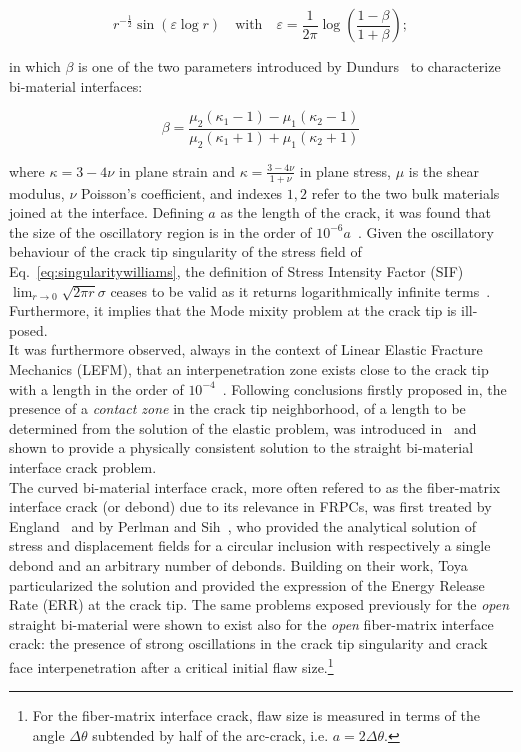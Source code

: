 \documentclass[review]{elsarticle}
\begin{document}
\begin{equation}\label{eq:singularitywilliams}
r^{-\frac{1}{2}}\sin\left(\varepsilon\log r\right)\quad\text{with}\quad\varepsilon=\frac{1}{2\pi}\log\left(\frac{1-\beta}{1+\beta}\right);
\end{equation}

in which $\beta$ is one of the two parameters introduced by Dundurs~\cite{Dundurs1969} to characterize bi-material interfaces:

\begin{equation}\label{eq:dundursbeta}
\beta=\frac{\mu_{2}\left(\kappa_{1}-1\right)-\mu_{1}\left(\kappa_{2}-1\right)}{\mu_{2}\left(\kappa_{1}+1\right)+\mu_{1}\left(\kappa_{2}+1\right)}
\end{equation}

where $\kappa=3-4\nu$ in plane strain and $\kappa=\frac{3-4\nu}{1+\nu}$ in plane stress, $\mu$ is the shear modulus, $\nu$ Poisson's coefficient, and indexes $1,2$ refer to the two bulk materials joined at the interface. Defining $a$ as the length of the crack, it was found that the size of the oscillatory region is in the order of $10^{-6}a$~\cite{Erdogan1963}. Given the oscillatory behaviour of the crack tip singularity of the stress field of Eq.~\ref{eq:singularitywilliams}, the definition of Stress Intensity Factor (SIF) $\lim_{r\rightarrow 0}\sqrt{2\pi r}\sigma$ ceases to be valid as it returns logarithmically infinite terms~\cite{Comninou1990}. Furthermore, it implies that the Mode mixity problem at the crack tip is ill-posed.\\
It was furthermore observed, always in the context of Linear Elastic Fracture Mechanics (LEFM), that an interpenetration zone exists close to the crack tip~\cite{England1965,Malyshev1965} with a length in the order of $10^{-4}$~\cite{England1965}. Following conclusions firstly proposed in\cite{Malyshev1965}, the presence of a \emph{contact zone} in the crack tip neighborhood, of a length to be determined from the solution of the elastic problem, was introduced in~\cite{Comninou1977} and shown to provide a physically consistent solution to the straight bi-material interface crack problem.\\
The curved bi-material interface crack, more often refered to as the fiber-matrix interface crack (or debond) due to its relevance in FRPCs, was first treated by England~\cite{England1966} and by Perlman and Sih~\cite{Perlman1967}, who provided the analytical solution of stress and displacement fields for a circular inclusion with respectively a single debond and an arbitrary number of debonds. Building on their work, Toya~\cite{Toya1974} particularized the solution and provided the expression of the Energy Release Rate (ERR) at the crack  tip. The same problems exposed previously for the \emph{open} straight bi-material were shown to exist also for the \emph{open} fiber-matrix interface crack: the presence of strong oscillations in the crack tip singularity and crack face interpenetration after a critical initial flaw size.\footnote{For the fiber-matrix interface crack, flaw size is measured in terms of the angle $\Delta\theta$ subtended by half of the arc-crack, i.e. $a=2\Delta\theta$.}\\
\end{document}
